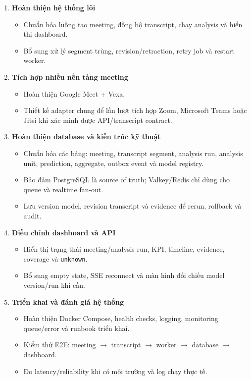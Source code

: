 \documentclass[12pt,a4paper]{article}
\begin{document}
\begin{enumerate}
  \item \textbf{Hoàn thiện hệ thống lõi}
  \begin{itemize}
    \item Chuẩn hóa luồng tạo meeting, đồng bộ transcript, chạy analysis và hiển thị dashboard.
    \item Bổ sung xử lý segment trùng, revision/retraction, retry job và restart worker.
  \end{itemize}

  \item \textbf{Tích hợp nhiều nền tảng meeting}
  \begin{itemize}
    \item Hoàn thiện Google Meet + Vexa.
    \item Thiết kế adapter chung để lần lượt tích hợp Zoom, Microsoft Teams hoặc Jitsi khi xác minh được API/transcript contract.
  \end{itemize}

  \item \textbf{Hoàn thiện database và kiến trúc kỹ thuật}
  \begin{itemize}
    \item Chuẩn hóa các bảng: meeting, transcript segment, analysis run, analysis unit, prediction, aggregate, outbox event và model registry.
    \item Bảo đảm PostgreSQL là source of truth; Valkey/Redis chỉ dùng cho queue và realtime fan-out.
    \item Lưu version model, revision transcript và evidence để rerun, rollback và audit.
  \end{itemize}

  \item \textbf{Điều chỉnh dashboard và API}
  \begin{itemize}
    \item Hiển thị trạng thái meeting/analysis run, KPI, timeline, evidence, coverage và \texttt{unknown}.
    \item Bổ sung empty state, SSE reconnect và màn hình đối chiếu model version/run khi cần.
  \end{itemize}

  \item \textbf{Triển khai và đánh giá hệ thống}
  \begin{itemize}
    \item Hoàn thiện Docker Compose, health checks, logging, monitoring queue/error và runbook triển khai.
    \item Kiểm thử E2E: meeting $\rightarrow$ transcript $\rightarrow$ worker $\rightarrow$ database $\rightarrow$ dashboard.
    \item Đo latency/reliability khi có môi trường và log chạy thực tế.
  \end{itemize}


\end{enumerate}
\end{document}
